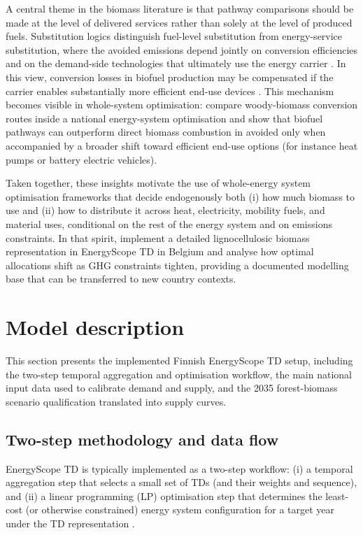 \documentclass{article}
\begin{document}
A central theme in the biomass literature is that pathway comparisons should be made at the level of delivered services rather than solely at the level of produced fuels. Substitution logics distinguish fuel-level substitution from energy-service substitution, where the avoided emissions depend jointly on conversion efficiencies and on the demand-side technologies that ultimately use the energy carrier \citep{wahlundIncreasingBiomassUtilisation2004}. In this view, conversion losses in biofuel production may be compensated if the carrier enables substantially more efficient end-use devices \citep{steubingHeatElectricityTransportation2012}. This mechanism becomes visible in whole-system optimisation: \citet{codinagironesAssessmentCO2Mitigation2018} compare woody-biomass conversion routes inside a national energy-system optimisation and show that biofuel pathways can outperform direct biomass combustion in avoided  only when accompanied by a broader shift toward efficient end-use options (for instance heat pumps or battery electric vehicles).


Taken together, these insights motivate the use of whole-energy system optimisation frameworks that decide endogenously both (i) how much biomass to use and (ii) how to distribute it across heat, electricity, mobility fuels, and material uses, conditional on the rest of the energy system and on emissions constraints. In that spirit, \citet{collaOptimalUseLignocellulosic2022} implement a detailed lignocellulosic biomass representation in EnergyScope TD in Belgium and analyse how optimal allocations shift as GHG constraints tighten, providing a documented modelling base that can be transferred to new country contexts.

\section{Model description}
\label{sec:model_description}

This section presents the implemented Finnish EnergyScope TD setup, including the two-step temporal aggregation and optimisation workflow, the main national input data used to calibrate demand and supply, and the 2035 forest-biomass scenario qualification translated into supply curves.

\subsection{Two-step methodology and data flow}
EnergyScope TD is typically implemented as a two-step workflow:
(i) a temporal aggregation step that selects a small set of TDs (and their weights and sequence), and
(ii) a linear programming (LP) optimisation step that determines the least-cost (or otherwise constrained) energy system configuration for a target year under the TD representation \citep{limpensGeneratingEnergyTransition2021}.
\end{document}

